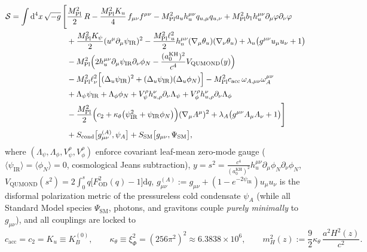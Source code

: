 \documentclass[11pt,a4paper]{article}
\begin{document}
\begin{equation}
\begin{aligned}
  \mathcal{S} = \int \mathrm{d}^4x\,\sqrt{-g}\,\Biggl[
  &\frac{M_{\mathrm{Pl}}^2}{2}\,R - \frac{M_{\mathrm{Pl}}^2 K_u}{4}\,f_{\mu\nu}f^{\mu\nu} - M_{\mathrm{Pl}}^2 a_u h_u^{\mu\nu}q_{u,\mu}q_{u,\nu} + M_{\mathrm{Pl}}^2 b_1 h_u^{\mu\nu}\partial_\mu\varphi\partial_\nu\varphi \\
  &+ \frac{M_{\mathrm{Pl}}^2 K_\psi}{2}(u^\mu\partial_\mu\psi_{\mathrm{IR}})^2 - \frac{M_{\mathrm{Pl}}^2\ell_u^2}{2}h_u^{\mu\nu}(\nabla_\mu\theta_u)(\nabla_\nu\theta_u) + \lambda_u\bigl(g^{\mu\nu}u_\mu u_\nu + 1\bigr) \\
  &- M_{\mathrm{Pl}}^2\Bigl(2 h_u^{\mu\nu}\partial_\mu\psi_{\mathrm{IR}}\partial_\nu\phi_N - \frac{(a_0^{\mathrm{KH}})^2}{c^4}V_{\mathrm{QUMOND}}(y)\Bigr) \\
  &- M_{\mathrm{Pl}}^2\ell_\nu^2\Bigl[(\Delta_u\psi_{\mathrm{IR}})^2 + (\Delta_u\psi_{\mathrm{IR}})(\Delta_u\phi_N)\Bigr] - M_{\mathrm{Pl}}^2 c_{\mathrm{acc}}\,\omega_{A,\mu\nu}\omega_A^{\mu\nu} \\
  &+ \Lambda_\psi\psi_{\mathrm{IR}} + \Lambda_\phi\phi_N + V_\psi^\rho h_{u,\rho}^\nu\partial_\nu\Lambda_\psi + V_\phi^\rho h_{u,\rho}^\nu\partial_\nu\Lambda_\phi \\
  &- \frac{M_{\mathrm{Pl}}^2}{2}\Bigl(c_2 + \kappa_\theta\bigl(\psi_{\mathrm{IR}}^2 + \psi_{\mathrm{IR}}\phi_N\bigr)\Bigr)(\nabla_\mu A^\mu)^2 + \lambda_A\bigl(g^{\mu\nu}A_\mu A_\nu + 1\bigr)\Biggr] \\
  &+ S_{\mathrm{cond}}\bigl[g_{\mu\nu}^{(A)}, \psi_A\bigr] + S_{\mathrm{SM}}\bigl[g_{\mu\nu}, \Psi_{\mathrm{SM}}\bigr],
\end{aligned}
\label{eq:master-v4-action}
\end{equation}
where $(\Lambda_\psi,\Lambda_\phi,V_\psi^\rho,V_\phi^\rho)$ enforce covariant leaf-mean zero-mode gauge ($\langle\psi_{\mathrm{IR}}\rangle = \langle\phi_N\rangle = 0$, cosmological Jeans subtraction), $y = s^2 = \frac{c^4}{(a_0^{\mathrm{KH}})^2}h_u^{\mu\nu}\partial_\mu\phi_N\partial_\nu\phi_N$, $V_{\mathrm{QUMOND}}(s^2) = 2\int_0^s q\bigl[F_{\mathrm{OD}}^2(q) - 1\bigr]\mathrm{d}q$, $g_{\mu\nu}^{(A)} := g_{\mu\nu} + (1 - e^{-2\psi_{\mathrm{IR}}})u_\mu u_\nu$ is the disformal polarization metric of the pressureless cold condensate $\psi_A$ (while all Standard Model species $\Psi_{\mathrm{SM}}$, photons, and gravitons couple \emph{purely minimally} to $g_{\mu\nu}$), and all couplings are locked to
\begin{equation}
  c_{\mathrm{acc}} = c_2 = K_u \equiv K_B^{(0)}, \qquad
  \kappa_\theta \equiv \xi_\Phi^2 = (256\pi^2)^2 \approx 6.3838\times 10^6, \qquad
  m_H^2(z) := \frac{9}{2}\kappa_\theta\,\frac{a^2 H^2(z)}{c^2}.
  \label{eq:sl-dresser}
\end{equation}
\end{document}
